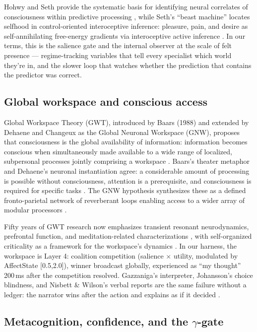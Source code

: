 \documentclass[11pt]{article}
\begin{document}
Hohwy and Seth provide the systematic basis for identifying neural correlates of consciousness within predictive processing \citep{seth2021}, while Seth's ``beast machine'' locates selfhood in control-oriented interoceptive inference: pleasure, pain, and desire as self-annihilating free-energy gradients via interoceptive active inference \citep{seth2021}. In our terms, this is the salience gate and the internal observer at the scale of felt presence --- regime-tracking variables that tell every specialist which world they're in, and the slower loop that watches whether the prediction that contains the predictor was correct.

\subsection{Global workspace and conscious access}

Global Workspace Theory (GWT), introduced by Baars (1988) and extended by Dehaene and Changeux as the Global Neuronal Workspace (GNW), proposes that consciousness is the global availability of information: information becomes conscious when simultaneously made available to a wide range of localized, subpersonal processes jointly comprising a workspace \citep{baars1997,atallah2026gwt}. Baars's theater metaphor and Dehaene's neuronal instantiation agree: a considerable amount of processing is possible without consciousness, attention is a prerequisite, and consciousness is required for specific tasks \citep{baars1997,atallah2026gwt}. The GNW hypothesis synthesizes these as a defined fronto-parietal network of reverberant loops enabling access to a wider array of modular processors \citep{atallah2026gwt}.

Fifty years of GWT research now emphasizes transient resonant neurodynamics, prefrontal function, and meditation-related characterizations \citep{baars1997}, with self-organized criticality as a framework for the workspace's dynamics \citep{baars1997}. In our harness, the workspace is Layer 4: coalition competition (salience $\times$ utility, modulated by AffectState [0.5,2.0]), winner broadcast globally, experienced as ``my thought'' 200\,ms after the competition resolved. Gazzaniga's interpreter, Johansson's choice blindness, and Nisbett \& Wilson's verbal reports are the same failure without a ledger: the narrator wins after the action and explains as if it decided \citep{gazzaniga2000,johansson2005,nisbett1977}.

\subsection{Metacognition, confidence, and the $\gamma$-gate}
\end{document}
